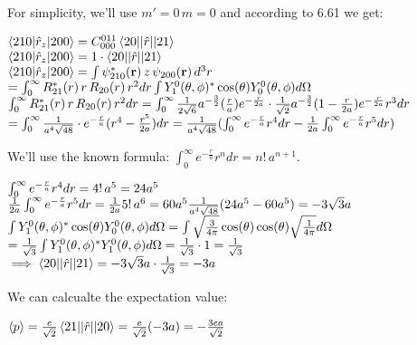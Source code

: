 \documentclass[14pt]{extarticle}
\makeatletter
\newenvironment{lefteqs}{%
    \begin{flushleft}%
    \renewcommand{\arraystretch}{1.3}%
    $\begin{array}{@{}l@{}}%
}{%
    \end{array}$%
    \end{flushleft}%
}
\makeatother
\begin{document}
For simplicity, we'll use $m'=0 \, m=0$ and according to 6.61 we get:
\begin{lefteqs}
    \braket{210 | \hat{r}_z |  200} = C^{0 1 1}_{0 0 0} \braket{20 || \hat{r} || 21} \\
    \braket{210 | \hat{r}_z |  200} = 1 \cdot \braket{20 || \hat{r} || 21} \\
    \braket{210 | \hat{r}_z |  200} = \int \psi_{210}^*(\mathbf{r}) \, z \, \psi_{200}(\mathbf{r}) \, d^3r \\
    = \int_0^\infty R_{21}^*(r) \, r \, R_{20}(r) \, r^2 dr \int Y^0_1(\theta, \phi)^* \cos(\theta) Y^0_0(\theta, \phi) d\Omega \\
    \int_0^\infty R_{21}^*(r) \, r \, R_{20}(r) \, r^2 dr = \int_0^\infty \frac{1}{2\sqrt{6}} a^{-\frac{3}{2}} (\frac{r}{a}) e^{-\frac{r}{2a}} \cdot \frac{1}{\sqrt{2}} a^{-\frac{3}{2}} (1 - \frac{r}{2a}) e^{-\frac{r}{2a}} r^3 dr \\
    = \int_0^\infty \frac{1}{a^4 \sqrt{48}} \cdot e^{-\frac{r}{a}} (r^4 - \frac{r^5}{2a}) dr
    = \frac{1}{a^4 \sqrt{48}} (\int_0^\infty e^{-\frac{r}{a}} r^4 dr - \frac{1}{2a} \int_0^\infty e^{-\frac{r}{a}} r^5 dr) \\
\end{lefteqs}

We'll use the known formula: $\int_0^\infty e^{-\frac{r}{a}} r^n dr = n! \, a^{n+1}$.

\begin{lefteqs}
    \int_0^\infty e^{-\frac{r}{a}} r^4 dr = 4! \, a^5 = 24 a^5 \\
    \frac{1}{2a} \int_0^\infty e^{-\frac{r}{a}} r^5 dr = \frac{1}{2a} 5! \, a^6 = 60 a^5
    \frac{1}{a^4 \sqrt{48}} (24 a^5 - 60 a^5) = -3 \sqrt{3} a \\
    \int Y^0_1(\theta, \phi)^* \cos(\theta) Y^0_0(\theta, \phi) d\Omega
    = \int \sqrt{\frac{3}{4\pi}} \cos(\theta) \cos(\theta)  \sqrt{\frac{1}{4\pi}} d\Omega \\
    = \frac{1}{\sqrt{3}} \int Y^0_1(\theta, \phi)^*  Y^0_1(\theta, \phi) d\Omega = \frac{1}{\sqrt{3}} \cdot 1 = \frac{1}{\sqrt{3}} \\
    \implies \braket{20 || \hat{r} || 21} = -3 \sqrt{3} a \cdot \frac{1}{\sqrt{3}} = -3 a
\end{lefteqs}

We can calcualte the expectation value:
\begin{lefteqs}
    \braket{p} = \frac{e}{\sqrt{2}} \braket{21 || \hat{r} || 20} = \frac{e}{\sqrt{2}} (-3 a) = -\frac{3 e a}{\sqrt{2}}
\end{lefteqs}
\end{document}
